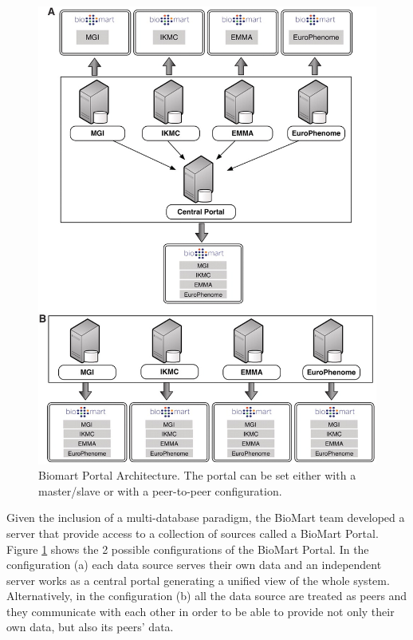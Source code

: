 \begin{figure}  
\centering
\includegraphics[width=\textwidth]{figures/biomart.png}
\caption[Biomart Portal Architecture.]{Biomart Portal Architecture. The portal can be set either with a master/slave or with a peer-to-peer configuration.
\label{fig:biomart}}
\end{figure}

Given the inclusion of a multi-database paradigm, the BioMart team developed a server that provide access to a collection of sources called a BioMart Portal. Figure \ref{fig:biomart} shows the 2 possible configurations of the BioMart Portal. In the configuration (a) each data source serves their own data and an independent server works as a central portal generating a unified view of the whole system. Alternatively, in the configuration (b) all the data source are treated as peers and they communicate with each other in order to be able to provide not only their own data, but also its peers' data.

